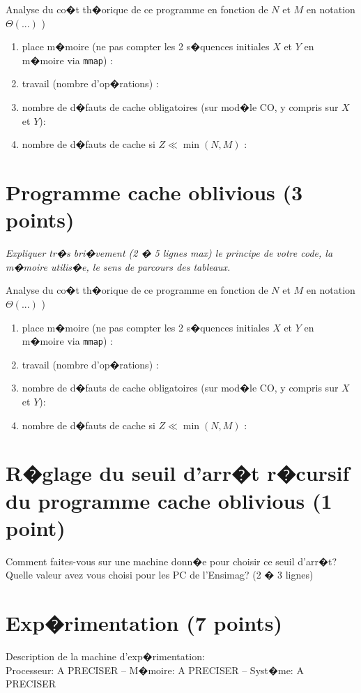 \documentclass[10pt,a4paper]{article}
\begin{document}
Analyse du co�t th�orique de ce  programme en fonction de $N$ et $M$  en notation $\Theta(...)$ )
\begin{enumerate}
  \item place m�moire (ne pas compter les 2 s�quences initiales $X$ et $Y$ en m�moire via {\tt mmap}) : 
  \item travail (nombre d'op�rations) : 
  \item nombre de d�fauts de cache obligatoires (sur mod�le CO, y compris sur $X$ et $Y$):
  \item nombre de d�fauts de cache si $Z \ll \min(N,M)$ : 
\end{enumerate}

\section{Programme cache oblivious  (3 points)}
{\em Expliquer tr�s bri�vement (2 � 5 lignes max) le principe de votre code, la m�moire utilis�e, le sens de parcours des tableaux.}
\vspace*{1.0cm}

Analyse du co�t th�orique de ce  programme en fonction de $N$ et $M$  en notation $\Theta(...)$ )
\begin{enumerate}
  \item place m�moire (ne pas compter les 2 s�quences initiales $X$ et $Y$ en m�moire via {\tt mmap}) : 
  \item travail (nombre d'op�rations) : 
  \item nombre de d�fauts de cache obligatoires (sur mod�le CO, y compris sur $X$ et $Y$):
  \item nombre de d�fauts de cache si $Z \ll \min(N,M)$ : 
\end{enumerate}

\section{R�glage du seuil d'arr�t r�cursif du programme cache oblivious  (1 point)} 
Comment faites-vous sur une machine donn�e pour choisir ce seuil d'arr�t? Quelle valeur avez vous choisi pour les
PC de l'Ensimag? (2 � 3 lignes) 

\section{Exp�rimentation (7 points)}

Description de la machine d'exp�rimentation:  \\
Processeur: A PRECISER  --
M�moire: A PRECISER --
Syst�me: A PRECISER 
\end{document}
